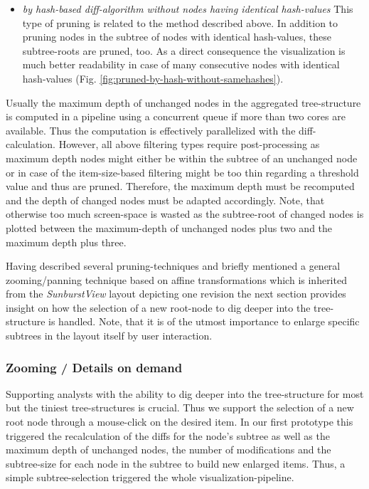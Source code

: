 \begin{itemize}

\item \emph{by hash-based diff-algorithm without nodes having identical hash-values} This type of pruning is related to the method described above. In addition to pruning nodes in the subtree of nodes with identical hash-values, these subtree-roots are pruned, too. As a direct consequence the visualization is much better readability in case of many consecutive nodes with identical hash-values (Fig. \ref{fig:pruned-by-hash-without-samehashes}).

\end{itemize}

Usually the maximum depth of unchanged nodes in the aggregated tree-structure is computed in a pipeline using a concurrent queue if more than two cores are available. Thus the computation is effectively parallelized with the diff-calculation. However, all above filtering types require post-processing as maximum depth nodes might either be within the subtree of an unchanged node or in case of the item-size-based filtering might be too thin regarding a threshold value and thus are pruned. Therefore, the maximum depth must be recomputed and the depth of changed nodes must be adapted accordingly. Note, that otherwise too much screen-space is wasted as the subtree-root of changed nodes is plotted between the maximum-depth of unchanged nodes plus two and the maximum depth plus three.

Having described several pruning-techniques and briefly mentioned a general zooming/panning technique based on affine transformations which is inherited from the \emph{SunburstView} layout depicting one revision the next section provides insight on how the selection of a new root-node to dig deeper into the tree-structure is handled. Note, that it is of the utmost importance to enlarge specific subtrees in the layout itself by user interaction. 

\subsubsection{Zooming / Details on demand} 
Supporting analysts with the ability to dig deeper into the tree-structure for most but the tiniest tree-structures is crucial. Thus we support the selection of a new root node through a mouse-click on the desired item. In our first prototype this triggered the recalculation of the diffs for the node's subtree as well as the maximum depth of unchanged nodes, the number of modifications and the subtree-size for each node in the subtree to build new enlarged items. Thus, a simple subtree-selection triggered the whole visualization-pipeline.

